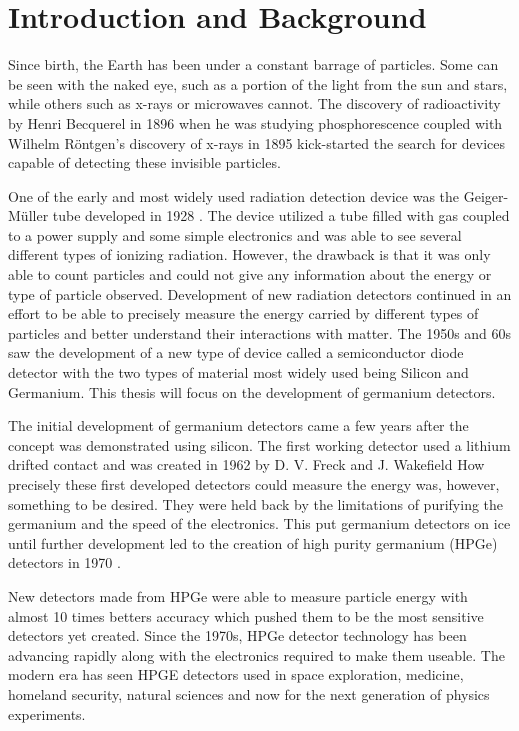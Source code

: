 \chapter{Introduction and Background}

Since birth, the Earth has been under a constant barrage of particles.
Some can be seen with the naked eye, such as a portion of the light from the sun and stars, while others such as x-rays or microwaves cannot.
The discovery of radioactivity by Henri Becquerel in 1896 when he was studying phosphorescence \cite{Mould} coupled with Wilhelm R{\"o}ntgen's discovery of x-rays in 1895 \cite{wilhelm} kick-started the search for devices capable of detecting these invisible particles.

One of the early and most widely used radiation detection device was the Geiger-M{\"u}ller tube developed in 1928 \cite{geiger}.
The device utilized a tube filled with gas coupled to a power supply and some simple electronics and was able to see several different types of ionizing radiation.
However, the drawback is that it was only able to count particles and could not give any information about the energy or type of particle observed.
Development of new radiation detectors continued in an effort to be able to precisely measure the energy carried by different types of particles and better understand their interactions with matter.
The 1950s and 60s saw the development of a new type of device called a semiconductor diode detector with the two types of material most widely used being Silicon and Germanium.
This thesis will focus on the development of germanium detectors.

The initial development of germanium detectors came a few years after the concept was demonstrated using silicon.
The first working detector used a lithium drifted contact and was created in 1962 by D. V. Freck and J. Wakefield \cite{1962Natur}
How precisely these first developed detectors could measure the energy was, however, something to be desired.
They were held back by the limitations of purifying the germanium and the speed of the electronics.
This put germanium detectors on ice until further development led to the creation of high purity germanium (HPGe) detectors in 1970 \cite{Baertsch1970,Tavendale1970}.

New detectors made from HPGe were able to measure particle energy with almost 10 times betters accuracy which pushed them to be the most sensitive detectors yet created.
Since the 1970s, HPGe detector technology has been advancing rapidly along with the electronics required to make them useable.
The modern era has seen HPGE detectors used in space exploration, medicine, homeland security, natural sciences and now for the next generation of physics experiments.

